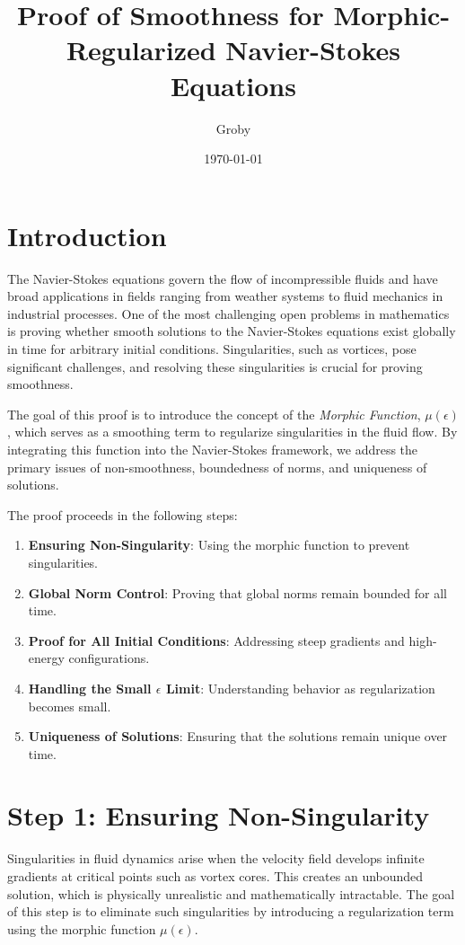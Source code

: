 \documentclass{article}
\title{Proof of Smoothness for Morphic-Regularized Navier-Stokes Equations}
\author{Groby}
\date{\today}
\begin{document}
\maketitle

\section*{Introduction}

The Navier-Stokes equations govern the flow of incompressible fluids and have broad applications in fields ranging from weather systems to fluid mechanics in industrial processes. One of the most challenging open problems in mathematics is proving whether smooth solutions to the Navier-Stokes equations exist globally in time for arbitrary initial conditions. Singularities, such as vortices, pose significant challenges, and resolving these singularities is crucial for proving smoothness.

The goal of this proof is to introduce the concept of the \textit{Morphic Function}, \( \mu(\epsilon) \), which serves as a smoothing term to regularize singularities in the fluid flow. By integrating this function into the Navier-Stokes framework, we address the primary issues of non-smoothness, boundedness of norms, and uniqueness of solutions.

The proof proceeds in the following steps:

\begin{enumerate}
    \item \textbf{Ensuring Non-Singularity}: Using the morphic function to prevent singularities.
    \item \textbf{Global Norm Control}: Proving that global norms remain bounded for all time.
    \item \textbf{Proof for All Initial Conditions}: Addressing steep gradients and high-energy configurations.
    \item \textbf{Handling the Small \( \epsilon \) Limit}: Understanding behavior as regularization becomes small.
    \item \textbf{Uniqueness of Solutions}: Ensuring that the solutions remain unique over time.
\end{enumerate}

\section*{Step 1: Ensuring Non-Singularity}

Singularities in fluid dynamics arise when the velocity field develops infinite gradients at critical points such as vortex cores. This creates an unbounded solution, which is physically unrealistic and mathematically intractable. The goal of this step is to eliminate such singularities by introducing a regularization term using the morphic function \( \mu(\epsilon) \).
\end{document}
